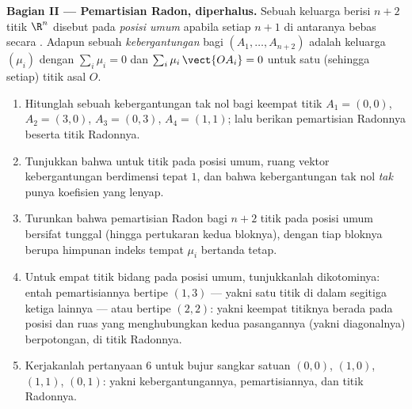 \begin{problem}
\medskip
\noindent\textbf{Bagian II --- Pemartisian Radon, diperhalus.} Sebuah
keluarga berisi $n + 2$ titik $\R^n$ disebut pada \emph{posisi
umum} apabila setiap $n + 1$ di antaranya bebas secara .
Adapun sebuah \emph{kebergantungan } bagi $(A_1, \dots, A_{n+2})$ adalah
keluarga $(\mu_i)$ dengan $\sum_i \mu_i = 0$ dan $\sum_i
\mu_i\,\vect{OA_i} = 0$ untuk satu (sehingga setiap) titik asal $O$.
\begin{enumerate}[resume]
  \item Hitunglah sebuah kebergantungan  tak nol bagi keempat
        titik $A_1 = (0,0)$, $A_2 = (3,0)$, $A_3 = (0,3)$,
        $A_4 = (1,1)$; lalu berikan pemartisian Radonnya beserta titik
        Radonnya.
  \item Tunjukkan bahwa untuk titik pada posisi umum, ruang
        vektor kebergantungan  berdimensi tepat
        $1$, dan bahwa kebergantungan tak nol \emph{tak} punya
        koefisien yang lenyap.
  \item Turunkan bahwa pemartisian Radon bagi $n + 2$ titik pada
        posisi umum bersifat tunggal (hingga pertukaran kedua
        bloknya), dengan tiap bloknya berupa himpunan indeks tempat
        $\mu_i$ bertanda tetap.
  \item Untuk empat titik bidang pada posisi umum,
        tunjukkanlah dikotominya: entah pemartisiannya bertipe
        $(1, 3)$ --- yakni satu titik di dalam segitiga
        ketiga lainnya --- atau bertipe $(2, 2)$: yakni keempat titiknya
        berada pada posisi  dan ruas yang menghubungkan
        kedua pasangannya (yakni diagonalnya) berpotongan, di titik
        Radonnya.
  \item Kerjakanlah pertanyaan 6 untuk bujur sangkar satuan $(0,0)$,
        $(1,0)$, $(1,1)$, $(0,1)$: yakni kebergantungannya, pemartisiannya, dan
        titik Radonnya.
\end{enumerate}


\end{problem}

